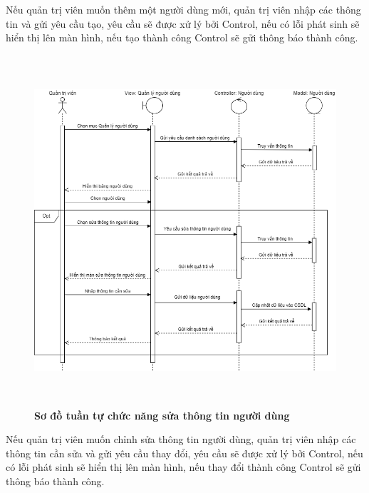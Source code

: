 Nếu quản trị viên muốn thêm một người dùng mới, quản trị viên nhập các thông tin và gửi yêu cầu tạo, yêu cầu sẽ được xử lý bởi Control, nếu có lỗi phát sinh sẽ hiển thị lên màn hình,
nếu tạo thành công Control sẽ gửi thông báo thành công. 
\begin{figure}[H]
  \centering
  \includegraphics[width=14cm,height=13cm]{Images/sequence/sequence_manage_edit_user.png}
  \caption[Sơ đồ tuần tự chức năng sửa thông tin người dùng]{\bfseries \fontsize{12pt}{0pt}
  \selectfont Sơ đồ tuần tự chức năng sửa thông tin người dùng}
  \label{sequence_manage_edit_user} %
\end{figure}
Nếu quản trị viên muốn chỉnh sửa thông tin người dùng, quản trị viên nhập các thông tin cần sửa và gửi yêu cầu thay đổi, yêu cầu sẽ được xử lý bởi Control, nếu có lỗi phát sinh sẽ hiển thị lên màn hình,
nếu thay đổi thành công Control sẽ gửi thông báo thành công. 
